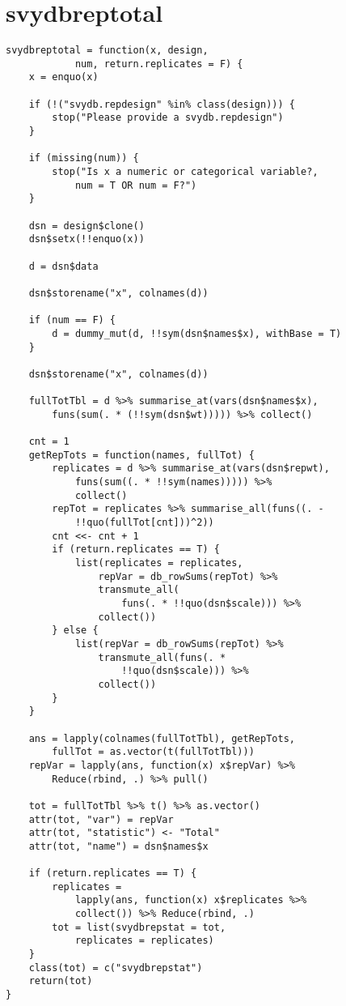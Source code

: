 \section{svydbreptotal}

\begin{lstlisting}
svydbreptotal = function(x, design, 
            num, return.replicates = F) {
    x = enquo(x)
    
    if (!("svydb.repdesign" %in% class(design))) {
        stop("Please provide a svydb.repdesign")
    }
    
    if (missing(num)) {
        stop("Is x a numeric or categorical variable?, 
            num = T OR num = F?")
    }
    
    dsn = design$clone()
    dsn$setx(!!enquo(x))
    
    d = dsn$data
    
    dsn$storename("x", colnames(d))
    
    if (num == F) {
        d = dummy_mut(d, !!sym(dsn$names$x), withBase = T)
    }
    
    dsn$storename("x", colnames(d))
    
    fullTotTbl = d %>% summarise_at(vars(dsn$names$x), 
        funs(sum(. * (!!sym(dsn$wt))))) %>% collect()
    
    cnt = 1
    getRepTots = function(names, fullTot) {
        replicates = d %>% summarise_at(vars(dsn$repwt), 
            funs(sum((. * !!sym(names))))) %>% 
            collect()
        repTot = replicates %>% summarise_all(funs((. - 
            !!quo(fullTot[cnt]))^2))
        cnt <<- cnt + 1
        if (return.replicates == T) {
            list(replicates = replicates, 
                repVar = db_rowSums(repTot) %>% 
                transmute_all(
                    funs(. * !!quo(dsn$scale))) %>% 
                collect())
        } else {
            list(repVar = db_rowSums(repTot) %>% 
                transmute_all(funs(. * 
                    !!quo(dsn$scale))) %>% 
                collect())
        }
    }
    
    ans = lapply(colnames(fullTotTbl), getRepTots, 
        fullTot = as.vector(t(fullTotTbl)))
    repVar = lapply(ans, function(x) x$repVar) %>% 
        Reduce(rbind, .) %>% pull()
    
    tot = fullTotTbl %>% t() %>% as.vector()
    attr(tot, "var") = repVar
    attr(tot, "statistic") <- "Total"
    attr(tot, "name") = dsn$names$x
    
    if (return.replicates == T) {
        replicates = 
            lapply(ans, function(x) x$replicates %>% 
            collect()) %>% Reduce(rbind, .)
        tot = list(svydbrepstat = tot, 
            replicates = replicates)
    }
    class(tot) = c("svydbrepstat")
    return(tot)
}
\end{lstlisting}

